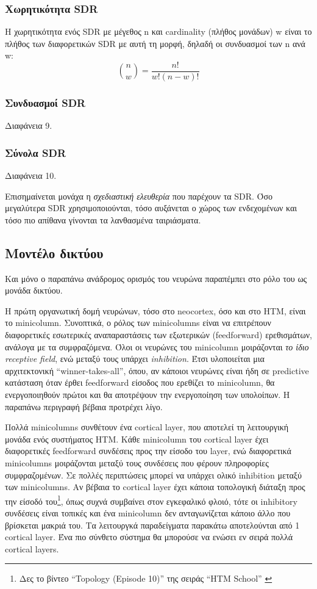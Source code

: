 \subsubsection{Χωρητικότητα SDR}

Η χωρητικότητα ενός SDR με μέγεθος n και cardinality (πλήθος μονάδων) w είναι το πλήθος των διαφορετικών SDR με αυτή τη μορφή, δηλαδή οι συνδυασμοί των n ανά w: $$ \binom nw= \frac{n!}{w!(n-w)!} $$

\subsubsection{Συνδυασμοί SDR}
Διαφάνεια 9.

\subsubsection{Σύνολα SDR}

Διαφάνεια 10.

Επισημαίνεται μονάχα η \emph{σχεδιαστική ελευθερία} που παρέχουν τα SDR.
Όσο μεγαλύτερα SDR χρησιμοποιούνται, τόσο αυξάνεται ο χώρος των ενδεχομένων και τόσο πιο απίθανα γίνονται τα λανθασμένα ταιριάσματα.


\subsection{Μοντέλο δικτύου}

Και μόνο ο παραπάνω ανάδρομος ορισμός του νευρώνα παραπέμπει στο ρόλο του ως μονάδα δικτύου.

Η πρώτη οργανωτική δομή νευρώνων, τόσο στο neocortex, όσο και στο HTM, είναι το minicolumn.
Συνοπτικά, ο ρόλος των minicolumns είναι να επιτρέπουν διαφορετικές εσωτερικές αναπαραστάσεις των εξωτερικών (feedforward) ερεθισμάτων, ανάλογα με τα συμφραζόμενα.
Όλοι οι νευρώνες του minicolumn μοιράζονται \emph{το ίδιο receptive field}, ενώ μεταξύ τους υπάρχει \emph{inhibition}.
Έτσι υλοποιείται μια αρχιτεκτονική ``winner-takes-all'', όπου, αν κάποιοι νευρώνες είναι ήδη σε predictive κατάσταση όταν έρθει feedforward είσοδος που ερεθίζει το minicolumn, θα ενεργοποιηθούν πρώτοι και θα αποτρέψουν την ενεργοποίηση των υπολοίπων.
Η παραπάνω περιγραφή βέβαια προτρέχει λίγο.

Πολλά minicolumns συνθέτουν ένα cortical layer, που αποτελεί τη λειτουργική μονάδα ενός συστήματος HTM.
Κάθε minicolumn του cortical layer έχει διαφορετικές feedforward συνδέσεις προς την είσοδο του layer, ενώ διαφορετικά minicolumns μοιράζονται μεταξύ τους συνδέσεις που φέρουν πληροφορίες συμφραζομένων.
Σε πολλές περιπτώσεις μπορεί να υπάρχει ολικό inhibition μεταξύ των minicolumns.
Αν βέβαια το cortical layer έχει κάποια τοπολογική διάταξη προς την είσοδό του\footnote{Δες το βίντεο ``Topology (Episode 10)'' της σειράς ``HTM School'' \cite{htmschool}}, όπως συχνά συμβαίνει στον εγκεφαλικό φλοιό, τότε οι inhibitory συνδέσεις είναι τοπικές και ένα minicolumn δεν ανταγωνίζεται κάποιο άλλο που βρίσκεται μακριά του.
Τα λειτουργκά παραδείγματα παρακάτω αποτελούνται από 1 cortical layer.
Ένα πιο σύνθετο σύστημα θα μπορούσε να ενώσει εν σειρά πολλά cortical layers.

